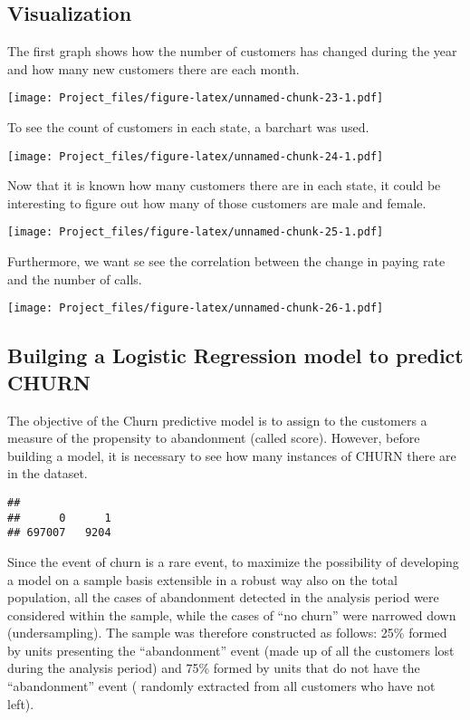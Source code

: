 \documentclass[]{article}
\newenvironment{Shaded}{\begin{snugshade}}{\end{snugshade}}
\newcommand{\KeywordTok}[1]{\textcolor[rgb]{0.13,0.29,0.53}{\textbf{#1}}}
\newcommand{\OperatorTok}[1]{\textcolor[rgb]{0.81,0.36,0.00}{\textbf{#1}}}
\newcommand{\NormalTok}[1]{#1}
\begin{document}
\subsection{Visualization}\label{visualization}

The first graph shows how the number of customers has changed during the
year and how many new customers there are each month.

\texttt{[image: Project\_files/figure-latex/unnamed-chunk-23-1.pdf]}

To see the count of customers in each state, a barchart was used.

\texttt{[image: Project\_files/figure-latex/unnamed-chunk-24-1.pdf]}

Now that it is known how many customers there are in each state, it
could be interesting to figure out how many of those customers are male
and female.

\texttt{[image: Project\_files/figure-latex/unnamed-chunk-25-1.pdf]}

Furthermore, we want se see the correlation between the change in paying
rate and the number of calls.

\texttt{[image: Project\_files/figure-latex/unnamed-chunk-26-1.pdf]}

\subsection{Builging a Logistic Regression model to predict
CHURN}\label{builging-a-logistic-regression-model-to-predict-churn}

The objective of the Churn predictive model is to assign to the
customers a measure of the propensity to abandonment (called score).
However, before building a model, it is necessary to see how many
instances of CHURN there are in the dataset.

\begin{Shaded}
\end{Shaded}

\begin{verbatim}
## 
##      0      1 
## 697007   9204
\end{verbatim}

Since the event of churn is a rare event, to maximize the possibility of
developing a model on a sample basis extensible in a robust way also on
the total population, all the cases of abandonment detected in the
analysis period were considered within the sample, while the cases of
``no churn'' were narrowed down (undersampling). The sample was
therefore constructed as follows: 25\% formed by units presenting the
``abandonment'' event (made up of all the customers lost during the
analysis period) and 75\% formed by units that do not have the
``abandonment'' event ( randomly extracted from all customers who have
not left).
\end{document}

